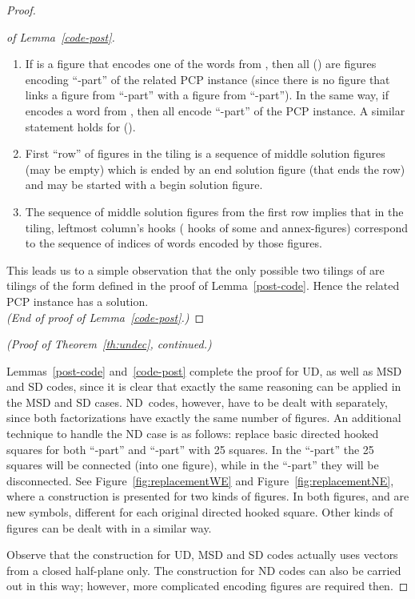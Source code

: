 \documentclass[final,nomarks]{dmtcs-episciences}
\begin{document}
\begin{proof}
\begin{proof}[of Lemma~\ref{code-post}]
\begin{enumerate}
\item If  is a figure that encodes one of the words from ,
then all  () are figures encoding
``-part'' of the related PCP instance (since there is no figure
that links a figure from ``-part'' with a
figure from ``-part''). In the same way, if  encodes a word
from , then all  encode ``-part'' of the
PCP instance. A similar statement holds for  ().

\item First ``row'' of figures in the tiling is a sequence of middle
solution figures (may be empty) which is ended by
an end solution figure (that ends the row) and may be started with a
begin solution figure.

\item The sequence of middle solution figures from the first row
implies that in the tiling, leftmost column's hooks ( hooks
of some  and  annex-figures) correspond to the sequence
of indices of words encoded by those figures.

\end{enumerate}
This leads us to a simple observation that the only possible two
tilings of  are tilings of the form defined in
the proof of Lemma~\ref{post-code}. Hence the
related PCP instance has a solution.\\
\textit{(End of proof of Lemma~\ref{code-post}.)}
\end{proof}

\noindent\textit{(Proof of Theorem~\ref{th:undec}, continued.)}

Lemmas~\ref{post-code} and~\ref{code-post} complete the proof for 
UD, as well as MSD and SD codes, since it is clear
that exactly the same reasoning can be applied in the MSD and SD
cases. ND~codes, however, have to be dealt with separately, since both
factorizations have exactly the same number of figures. An additional technique
to handle the ND case is as follows: replace basic directed
hooked squares for both ``-part'' and ``-part'' with 25
squares. In the ``-part'' the 25 squares will be connected
(into one figure), while in the ``-part'' they will be
disconnected. See Figure~\ref{fig:replacementWE} and
Figure~\ref{fig:replacementNE}, where a construction is
presented for two kinds of figures. In both figures,  and
 are new symbols, different for each original directed
hooked square. Other kinds of figures can be dealt with in a
similar way.

Observe that the construction for UD, MSD and SD codes actually
uses vectors from a closed half-plane only. The construction for
ND codes can also be carried out in this way; however, more
complicated encoding figures are required then.



\end{proof}
\end{document}
